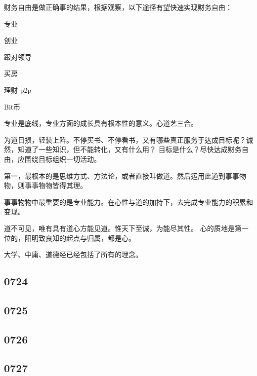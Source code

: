 财务自由是做正确事的结果，根据观察，以下途径有望快速实现财务自由：
\begin{enumbox}
\item 专业
\item 创业
\item 跟对领导
\item 买房
\item 理财 p2p
\item Bit币
\end{enumbox}

专业是底线，专业方面的成长具有根本性的意义。心道艺三合。

为道日损，轻装上阵。不停买书、不停看书，又有哪些真正服务于达成目标呢？诚然，知道了一些知识，但不能转化，又有什么用？
目标是什么？尽快达成财务自由，应围绕目标组织一切活动。

第一，最根本的是思维方式、方法论，或者直接叫做道。然后运用此道到事事物物，则事事物物皆得其理。

事事物物中最重要的是专业能力。在心性与道的加持下，去完成专业能力的积累和变现。

道不可见，唯有具有道心方能见道。惟天下至诚，为能尽其性。
心的质地是第一位的，阳明致良知的起点与归属，都是心。

大学、中庸、道德经已经包括了所有的理念。

\subsection{0724}

\subsection{0725}

\subsection{0726}

\subsection{0727}
